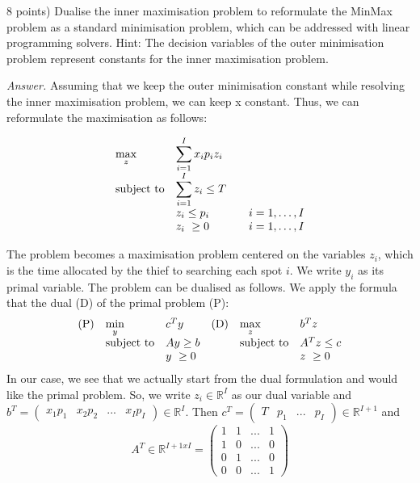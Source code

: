 \documentclass[10pt]{article}
\newenvironment{exercise}[2][Exercise]{\begin{trivlist}
  \item[\hskip \labelsep {\bfseries #1}\hskip \labelsep {\bfseries #2.}]}{\end{trivlist}}
\begin{document}
\begin{exercise}{5.4} (8 points)
Dualise the inner maximisation problem to reformulate the MinMax problem as a standard minimisation problem, which can be addressed with linear programming solvers. Hint: The decision variables of the outer minimisation problem represent constants for the inner maximisation problem.

\textit{Answer.}
Assuming that we keep the outer minimisation constant while resolving the inner maximisation problem, we can keep x constant. Thus, we can reformulate the maximisation as follows:

\begin{equation}
\begin{array}{ll@{}lll}
\displaystyle\max_{z} && \displaystyle\sum\limits_{i=1}^{I} x_ip_iz_i\\

\text{subject to} 
&& \displaystyle\sum\limits_{i=1}^{I} z_i \leq T &&  \\
                && z_i  \leq p_i  &&  i=1 ,\dots, I\\
                && z_i\ \geq 0 &&i=1 ,\dots, I\\ 

\end{array}
\end{equation}

The problem becomes a maximisation problem centered on the variables $z_i$, which is the time allocated by the thief to searching each spot $i$. We write $y_i$ as its primal variable. The problem can be dualised as follows. 
We apply the formula that the dual (D) of the primal problem (P): 
\begin{equation}
\begin{array}{lll@{}llllll}
\text{(P)}  &\displaystyle\min_{y}\ &c^Ty && \text{(D)} & \displaystyle\max_{z}\ &b^Tz\\
&\text{subject to} 
&Ay\geq b &&&\text{subject to} &A^Tz\leq c\\
&& y\ \geq 0 &&&&z\ \geq 0\\ 

\end{array}
\end{equation}
In our case, we see that we actually start from the dual formulation and would like the primal problem. So, we write $z_i\in\mathbb{R}^{I}$ as our dual variable and $b^T = \begin{pmatrix}x_1p_1 & x_2p_2 & ... &x_Ip_I\end{pmatrix} \in\mathbb{R}^{I}$. Then  $c^T = \begin{pmatrix}T & p_1 & ... &p_I\end{pmatrix}\in\mathbb{R}^{I+1}$ and
\begin{equation*}
    A^T \in\mathbb{R}^{I+1xI} = \begin{pmatrix}
1 & 1 & ... & 1\\
1 & 0 & ... & 0 \\
0 & 1 & ... & 0 \\
0 & 0& ... & 1
\end{pmatrix}
\end{equation*}


\end{exercise}
\end{document}
